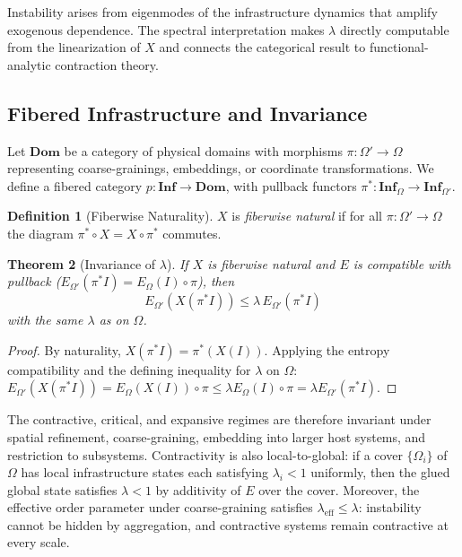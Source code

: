 \documentclass[10pt,twocolumn]{article}
\theoremstyle{plain}
\newtheorem{theorem}{Theorem}
\theoremstyle{definition}
\newtheorem{definition}[theorem]{Definition}
\theoremstyle{remark}
\begin{document}
Instability arises from eigenmodes of the infrastructure dynamics that
amplify exogenous dependence. The spectral interpretation makes $\lambda$
directly computable from the linearization of $X$ and connects the
categorical result to functional-analytic contraction theory.

\subsection{Fibered Infrastructure and Invariance}

Let $\mathbf{Dom}$ be a category of physical domains with morphisms
$\pi : \Omega' \to \Omega$ representing coarse-grainings, embeddings,
or coordinate transformations. We define a fibered category $p :
\mathbf{Inf} \to \mathbf{Dom}$, with pullback functors $\pi^* :
\mathbf{Inf}_\Omega \to \mathbf{Inf}_{\Omega'}$.

\begin{definition}[Fiberwise Naturality]
$X$ is \emph{fiberwise natural} if for all $\pi : \Omega' \to \Omega$
the diagram $\pi^* \circ X = X \circ \pi^*$ commutes.
\end{definition}

\begin{theorem}[Invariance of $\lambda$]
\label{thm:invariance}
If $X$ is fiberwise natural and $E$ is compatible with pullback
($E_{\Omega'}(\pi^* I) = E_\Omega(I) \circ \pi$), then
\[
  E_{\Omega'}(X(\pi^* I)) \leq \lambda\, E_{\Omega'}(\pi^* I)
\]
with the same $\lambda$ as on $\Omega$.
\end{theorem}

\begin{proof}
By naturality, $X(\pi^* I) = \pi^*(X(I))$. Applying the entropy
compatibility and the defining inequality for $\lambda$ on $\Omega$:
$E_{\Omega'}(X(\pi^* I)) = E_\Omega(X(I)) \circ \pi \leq
\lambda E_\Omega(I) \circ \pi = \lambda E_{\Omega'}(\pi^* I).$
\end{proof}

The contractive, critical, and expansive regimes are therefore invariant
under spatial refinement, coarse-graining, embedding into larger host
systems, and restriction to subsystems. Contractivity is also local-to-global:
if a cover $\{\Omega_i\}$ of $\Omega$ has local infrastructure states
each satisfying $\lambda_i < 1$ uniformly, then the glued global state
satisfies $\lambda < 1$ by additivity of $E$ over the cover.
Moreover, the effective order parameter under coarse-graining satisfies
$\lambda_{\mathrm{eff}} \leq \lambda$: instability cannot be hidden by
aggregation, and contractive systems remain contractive at every scale.
\end{document}
